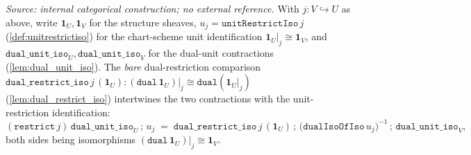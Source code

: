 \begin{lemma}\leanok
  \label{lem:dual_unit_iso_restrict_assemble}
  \textit{Source: internal categorical construction; no external reference.}
  With \(j : V \hookrightarrow U\) as above, write \(\mathbf 1_U, \mathbf 1_V\) for the structure
  sheaves, \(u_j = \mathtt{unitRestrictIso}\,j\) (\cref{def:unitrestrictiso}) for the chart-scheme
  unit identification \(\mathbf 1_U|_j \cong \mathbf 1_V\), and
  \(\mathtt{dual\_unit\_iso}_U, \mathtt{dual\_unit\_iso}_V\) for the dual-unit contractions
  (\cref{lem:dual_unit_iso}). The \emph{bare} dual-restriction comparison
  \(\mathtt{dual\_restrict\_iso}\,j\,(\mathbf 1_U) : (\mathtt{dual}\,\mathbf 1_U)|_j \cong
  \mathtt{dual}(\mathbf 1_U|_j)\) (\cref{lem:dual_restrict_iso}) intertwines the two contractions
  with the unit-restriction identification:
  \[
    (\mathtt{restrict}\,j)\,\mathtt{dual\_unit\_iso}_U \,\mathbin{;}\, u_j
      \;=\; \mathtt{dual\_restrict\_iso}\,j\,(\mathbf 1_U)
        \,\mathbin{;}\, \bigl(\mathtt{dualIsoOfIso}\,u_j\bigr)^{-1}
        \,\mathbin{;}\, \mathtt{dual\_unit\_iso}_V,
  \]
  both sides being isomorphisms \((\mathtt{dual}\,\mathbf 1_U)|_j \cong \mathbf 1_V\).
\end{lemma}
